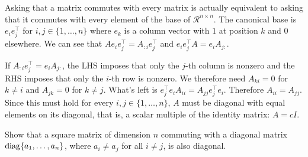 \begin{solution}
  Asking that a matrix commutes with every matrix is actually equivalent to asking
  that it commutes with every element of the base of $\mathcal{R}^{n \times n}$.
  The canonical base is $e_ie_j^\top$ for $i,j \in \{1, \dots, n\}$ where
  $e_k$ is a column vector with \(1\) at position $k$ and \(0\) elsewhere.
  We can see that $Ae_ie_j^\top = A_{:i}e_j^\top$ and $e_ie_j^\top A = e_iA_{j:}$.

  If $A_{:i}e_j^\top = e_iA_{j:}$, the LHS imposes that only the $j$-th column is nonzero
  and the RHS imposes that only the $i$-th row is nonzero.
  We therefore need $A_{ki} = 0$ for $k \neq i$ and $A_{jk} = 0$ for $k \neq j$.
  What's left is $e_j^\top e_iA_{ii} = A_{jj}e_j^\top e_i$.
  Therefore $A_{ii} = A_{jj}$.
  Since this must hold for every $i,j \in \{1, \dots, n\}$, $A$ must be diagonal
  with equal elements on its diagonal, that is, a scalar multiple of the identity matrix: \(A = cI\).
\end{solution}

Show that a square matrix of dimension \(n\) commuting with a diagonal matrix \(\operatorname{diag}\{a_1, \dots, a_n\}\), where \(a_i \neq a_j\) for all \(i \neq j\), is also diagonal.

